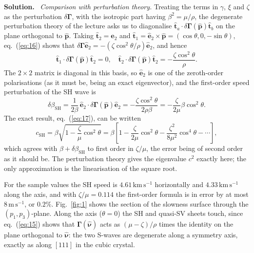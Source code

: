 \documentclass[a4paper,12pt]{paper}
\newenvironment{solution}{\par\noindent\textbf{Solution.}\ }{\par\medskip}
\begin{document}
\begin{solution}
\emph{Comparison with perturbation theory.} Treating the terms in $\gamma$, $\xi$ and $\zeta$
as the perturbation $\delta\bm{\Gamma}$, with the isotropic part having $\beta^{2}=\mu/\rho$, the
degenerate perturbation theory of the lecture asks us to diagonalise
$\hat{\mathbf{t}}_{a}\cdot\delta\bm{\Gamma}(\hat{\mathbf{p}})\hat{\mathbf{t}}_{b}$ on the plane
orthogonal to $\hat{\mathbf{p}}$. Taking $\hat{\mathbf{t}}_{2}=\hat{\mathbf{e}}_{2}$ and
$\hat{\mathbf{t}}_{1}=\hat{\mathbf{e}}_{2}\times\hat{\mathbf{p}}=(\cos\theta,0,-\sin\theta)$,
eq.~(\ref{eq:16}) shows that $\delta\bm{\Gamma}\hat{\mathbf{e}}_{2}=-(\zeta\cos^{2}\theta/\rho)\hat{\mathbf{e}}_{2}$, and hence
\begin{equation}
\hat{\mathbf{t}}_{1}\cdot\delta\bm{\Gamma}(\hat{\mathbf{p}})\hat{\mathbf{t}}_{2}=0,\quad
\hat{\mathbf{t}}_{2}\cdot\delta\bm{\Gamma}(\hat{\mathbf{p}})\hat{\mathbf{t}}_{2}=-\frac{\zeta\cos^{2}\theta}{\rho}.
\label{eq:19}
\end{equation}
The $2\times2$ matrix is diagonal in this basis, so $\hat{\mathbf{e}}_{2}$ is one of the
zeroth-order polarisations (as it must be, being an exact eigenvector), and the first-order
speed perturbation of the SH wave is
\begin{equation}
\delta\beta_{\mathrm{SH}}=\frac{1}{2\beta}\,\hat{\mathbf{e}}_{2}\cdot\delta\bm{\Gamma}(\hat{\mathbf{p}})\hat{\mathbf{e}}_{2}
=-\frac{\zeta\cos^{2}\theta}{2\rho\beta}=-\frac{\zeta}{2\mu}\beta\cos^{2}\theta.
\label{eq:20}
\end{equation}
The exact result, eq.~(\ref{eq:17}), can be written
\begin{equation}
c_{\mathrm{SH}}=\beta\sqrt{1-\frac{\zeta}{\mu}\cos^{2}\theta}
=\beta\left[1-\frac{\zeta}{2\mu}\cos^{2}\theta-\frac{\zeta^{2}}{8\mu^{2}}\cos^{4}\theta-\cdots\right],
\label{eq:21}
\end{equation}
which agrees with $\beta+\delta\beta_{\mathrm{SH}}$ to first order in $\zeta/\mu$, the error
being of second order as it should be. The perturbation theory gives the eigenvalue $c^{2}$
exactly here; the only approximation is the linearisation of the square root.


For the sample values the SH speed is $4.61\,\mathrm{km\,s^{-1}}$ horizontally and
$4.33\,\mathrm{km\,s^{-1}}$ along the axis, and with $\zeta/\mu=0.114$ the first-order
formula is in error by at most $8\,\mathrm{m\,s^{-1}}$, or $0.2\%$. Fig.~\ref{fig:1} shows
the section of the slowness surface through the $(p_{1},p_{3})$-plane. Along the axis
($\theta=0$) the SH and quasi-SV sheets touch, since eq.~(\ref{eq:15}) shows that
$\bm{\Gamma}(\hat{\bm{\nu}})$ acts as $(\mu-\zeta)/\rho$ times the identity on the plane
orthogonal to $\hat{\bm{\nu}}$: the two S-waves are degenerate along a symmetry axis, exactly
as along $[111]$ in the cubic crystal.
\end{solution}
\end{document}
